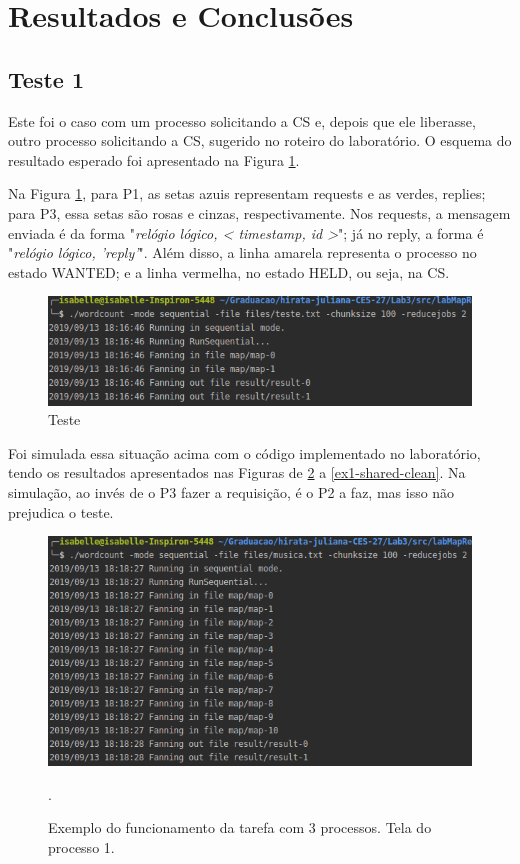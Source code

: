 \documentclass[conference]{IEEEtran}
\begin{document}
\section{Resultados e Conclusões} \label{results}

\subsection{Teste 1}

	Este foi o caso com um processo solicitando a CS e, depois que ele liberasse, outro processo solicitando a CS, sugerido no roteiro do laboratório. O esquema do resultado esperado foi apresentado na Figura \ref{ex1}.
	
	Na Figura \ref{ex1}, para P1, as setas azuis representam requests e as verdes, replies; para P3, essa setas são rosas e cinzas, respectivamente. Nos requests, a mensagem enviada é da forma "\textit{relógio lógico, < timestamp, id >}"; já no reply, a forma é "\textit{relógio lógico, 'reply'}". Além disso, a linha amarela representa o processo no estado WANTED; e a linha vermelha, no estado HELD, ou seja, na CS.
	
\begin{figure}[H]
\centering
\centerline{\includegraphics[scale=0.3]{imagens/tarefa_1_3/tarefa_1_3.png}}
\caption{Teste}
\label{ex1}
\end{figure}

	Foi simulada essa situação acima com o código implementado no laboratório, tendo os resultados apresentados nas Figuras de \ref{ex1-proc1-clean} a \ref{ex1-shared-clean}. Na simulação, ao invés de o P3 fazer a requisição, é o P2 a faz, mas isso não prejudica o teste.
	
\begin{figure}[H]
\centering
\centerline{\includegraphics[scale=0.5]{imagens/tarefa_1_4_1/tarefa_1_4_1.png}}
\caption{Exemplo do funcionamento da tarefa com 3 processos. Tela do processo 1.}.
\label{ex1-proc1-clean}
\end{figure}
\end{document}
